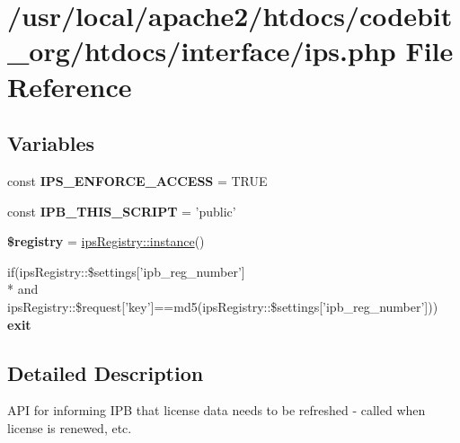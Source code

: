 \hypertarget{ips_8php}{\section{/usr/local/apache2/htdocs/codebit\-\_\-org/htdocs/interface/ips.php File Reference}
\label{ips_8php}
}
\subsection*{Variables}
\begin{DoxyCompactItemize}
\item 
\hypertarget{ips_8php_a80c7e2a07f828a55d6ba3f2f18060d17}{const {\bfseries I\-P\-S\-\_\-\-E\-N\-F\-O\-R\-C\-E\-\_\-\-A\-C\-C\-E\-S\-S} = T\-R\-U\-E}\label{ips_8php_a80c7e2a07f828a55d6ba3f2f18060d17}

\item 
\hypertarget{ips_8php_ad8356f086468696f258f1950da81003a}{const {\bfseries I\-P\-B\-\_\-\-T\-H\-I\-S\-\_\-\-S\-C\-R\-I\-P\-T} = 'public'}\label{ips_8php_ad8356f086468696f258f1950da81003a}

\item 
\hypertarget{ips_8php_a531e4a386aaa7f3e06d3642dc38d7e80}{{\bfseries \$registry} = \hyperlink{classips_registry_a0deb004950b8dc4f51836316fd19c111}{ips\-Registry\-::instance}()}\label{ips_8php_a531e4a386aaa7f3e06d3642dc38d7e80}

\item 
\hypertarget{ips_8php_a6d3293b01a7fd5a9b20a0effdd8b841f}{if(ips\-Registry\-::\$settings\mbox{[}'ipb\-\_\-reg\-\_\-number'\mbox{]} \\*
and ips\-Registry\-::\$request\mbox{[}'key'\mbox{]}==md5(ips\-Registry\-::\$settings\mbox{[}'ipb\-\_\-reg\-\_\-number'\mbox{]})) {\bfseries exit}}\label{ips_8php_a6d3293b01a7fd5a9b20a0effdd8b841f}

\end{DoxyCompactItemize}


\subsection{Detailed Description}
\begin{DoxyVerb}                 API for informing IPB that license data needs to be refreshed - called when license is renewed, etc.
\end{DoxyVerb}


